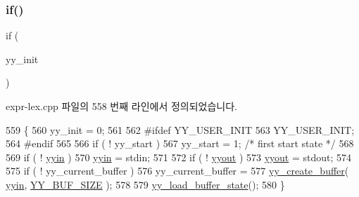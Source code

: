 \mbox{\label{expr-lex_8cpp_a709183e322e370a05cfdd3bb79f9ae79}} 
\subsubsection{\texorpdfstring{if()}{if()}\hspace{0.1cm}{\footnotesize\ttfamily [1/9]}}
{\footnotesize\ttfamily if (\begin{DoxyParamCaption}\item[{yy\+\_\+init}]{ }\end{DoxyParamCaption})}



expr-\/lex.\+cpp 파일의 558 번째 라인에서 정의되었습니다.


\begin{DoxyCode}
559                 \{
560                 yy\_init = 0;
561 
562 \textcolor{preprocessor}{#ifdef YY\_USER\_INIT}
563                 YY\_USER\_INIT;
564 \textcolor{preprocessor}{#endif}
565 
566                 \textcolor{keywordflow}{if} ( ! yy\_start )
567                         yy\_start = 1;   \textcolor{comment}{/* first start state */}
568 
569                 \textcolor{keywordflow}{if} ( ! \mbox{\hyperlink{expr-lex_8cpp_a87a127afa8f6c307fbfba10390675406}{yyin}} )
570                         \mbox{\hyperlink{expr-lex_8cpp_a87a127afa8f6c307fbfba10390675406}{yyin}} = stdin;
571 
572                 \textcolor{keywordflow}{if} ( ! \mbox{\hyperlink{expr-lex_8cpp_a296847b42b0baa62e2af36cb79f3c0eb}{yyout}} )
573                         \mbox{\hyperlink{expr-lex_8cpp_a296847b42b0baa62e2af36cb79f3c0eb}{yyout}} = stdout;
574 
575                 \textcolor{keywordflow}{if} ( ! yy\_current\_buffer )
576                         yy\_current\_buffer =
577                                 \mbox{\hyperlink{expr-lex_8cpp_a55588ac24161be2160e907e019dcae5c}{yy\_create\_buffer}}( \mbox{\hyperlink{expr-lex_8cpp_a87a127afa8f6c307fbfba10390675406}{yyin}}, 
      \mbox{\hyperlink{expr-lex_8cpp_ae7e51116e747d3390e7a6cfc6532834c}{YY\_BUF\_SIZE}} );
578 
579                 \mbox{\hyperlink{expr-lex_8cpp_a30fc8e518fa4e332a8657f6f8afa8fd9}{yy\_load\_buffer\_state}}();
580                 \}
\end{DoxyCode}
\mbox{\label{expr-lex_8cpp_addae29e78f788fccdc862bf7ab200706}} 
